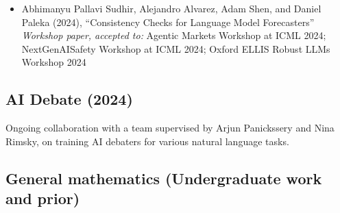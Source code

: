 \documentclass{article}
\begin{document}
\begin{itemize}

    \item
          Abhimanyu Pallavi Sudhir, Alejandro Alvarez, Adam Shen, and Daniel Paleka (2024), ``Consistency Checks for Language Model Forecasters'' \emph{Workshop paper, accepted to:} Agentic Markets Workshop at ICML 2024; NextGenAISafety Workshop at ICML 2024; Oxford ELLIS Robust LLMs Workshop 2024
\end{itemize}

\subsection*{AI Debate (2024)}

Ongoing collaboration with a team supervised by Arjun Panickssery and Nina Rimsky, on training AI debaters for various natural language tasks.

\subsection*{General mathematics (Undergraduate work and prior)}

\end{document}
